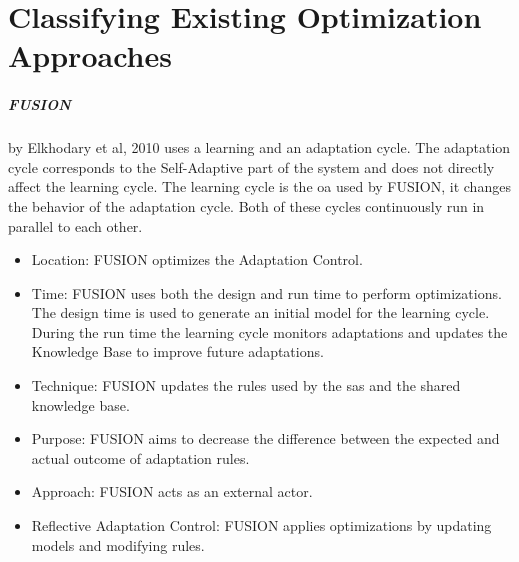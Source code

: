 \section{Classifying Existing Optimization Approaches}
\label{ch:Existing}


\subparagraph*{FUSION}
by Elkhodary et al, 2010 \cite*{FUSION}  uses a learning and an adaptation cycle.
The adaptation cycle corresponds to the Self-Adaptive part of the system
and does not directly affect the learning cycle.
The learning cycle is the \acrlong{oa} used by FUSION,
it changes the behavior of the adaptation cycle.
Both of these cycles continuously run in parallel to each other.
\begin{itemize}[nosep]
    \item Location: FUSION optimizes the Adaptation Control.
    \item Time: FUSION uses both the design and run time to perform optimizations.
    The design time is used to generate an initial model for the learning cycle.
    During the run time the learning cycle monitors adaptations
    and updates the Knowledge Base to improve future adaptations.
    \item Technique: FUSION updates the rules used by the \acrshort{sas} and the shared knowledge base.
    \item Purpose: FUSION aims to decrease the difference between the expected and actual outcome of adaptation rules.
    \item Approach: FUSION acts as an external actor.
    \item Reflective Adaptation Control: FUSION applies optimizations by updating models and modifying rules.
\end{itemize}

